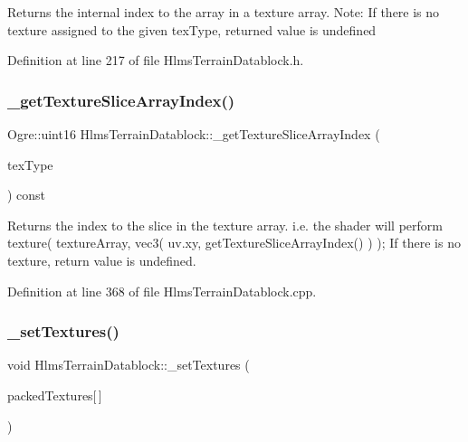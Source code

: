 Returns the internal index to the array in a texture array. Note\+: If there is no texture assigned to the given tex\+Type, returned value is undefined 

Definition at line 217 of file Hlms\+Terrain\+Datablock.\+h.

\mbox{\label{class_hlms_terrain_datablock_a19f88d8e892a4fbad4f535dcb41387d5}} 
\subsubsection{\texorpdfstring{\+\_\+get\+Texture\+Slice\+Array\+Index()}{\_getTextureSliceArrayIndex()}}
{\footnotesize\ttfamily Ogre\+::uint16 Hlms\+Terrain\+Datablock\+::\+\_\+get\+Texture\+Slice\+Array\+Index (\begin{DoxyParamCaption}\item[{Terrain\+Texture\+Types}]{tex\+Type }\end{DoxyParamCaption}) const}

Returns the index to the slice in the texture array. i.\+e. the shader will perform texture( texture\+Array, vec3( uv.\+xy, get\+Texture\+Slice\+Array\+Index() ) ); If there is no texture, return value is undefined. 

Definition at line 368 of file Hlms\+Terrain\+Datablock.\+cpp.

\mbox{\label{class_hlms_terrain_datablock_a9491ff27ef7052bcce3edb825acc61fe}} 
\subsubsection{\texorpdfstring{\+\_\+set\+Textures()}{\_setTextures()}}
{\footnotesize\ttfamily void Hlms\+Terrain\+Datablock\+::\+\_\+set\+Textures (\begin{DoxyParamCaption}\item[{const \hyperlink{struct_packed_texture}{Packed\+Texture}}]{packed\+Textures\mbox{[}$\,$\mbox{]} }\end{DoxyParamCaption})}


